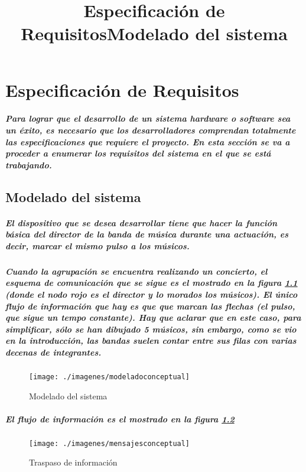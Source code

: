 \chapter{Especificación de Requisitos}
\title{Especificación de Requisitos}

\paragraph{
Para lograr que el desarrollo de un sistema hardware o software sea un éxito, es necesario que los desarrolladores comprendan totalmente las especificaciones que requiere el proyecto. En esta sección se va a proceder a enumerar los requisitos del sistema en el que se está trabajando.
}

\title{Modelado del sistema}
\section{
Modelado del sistema
}

\paragraph{
El dispositivo que se desea desarrollar tiene que hacer la función básica
del director de la banda de música durante una actuación, es decir,
marcar el mismo pulso a los músicos.
}

\paragraph{
Cuando la agrupación se encuentra realizando un concierto, el
esquema de comunicación que se sigue es el mostrado en la figura \ref{fig:modeladoconceptual}
(donde el nodo rojo es el director y lo morados los músicos). El único flujo de información
que hay es que que marcan las flechas (el pulso, que sigue un tempo constante). Hay que
aclarar que en este caso, para simplificar, sólo se han dibujado 5 músicos,
sin embargo, como se vio en la introducción, las bandas suelen contar entre sus filas con
varias decenas de integrantes.
}

\begin{figure}[htb]
\centering
\texttt{[image: ./imagenes/modeladoconceptual]}
\caption{Modelado del sistema} \label{fig:modeladoconceptual}
\end{figure}

\paragraph{
El flujo de información es el mostrado en la figura \ref{fig:mensajesconceptual}
}
  \begin{figure}[htb]
  \centering
  \texttt{[image: ./imagenes/mensajesconceptual]}
  \caption{Traspaso de información} \label{fig:mensajesconceptual}
  \end{figure}


